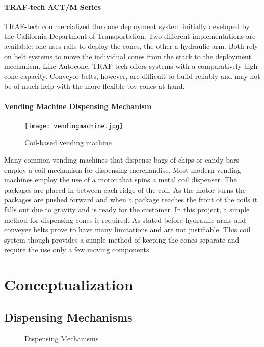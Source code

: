 \documentclass[11pt]{report}
\begin{document}
\subsubsection{TRAF-tech ACT/M Series}
TRAF-tech commercialized the cone deployment system initially developed by the California Department of Transportation. Two different implementations are available: one uses rails to deploy the cones, the other a hydraulic arm. Both rely on belt systems to move the individual cones from the stack to the deployment mechanism. Like Autocone, TRAF-tech offers systems with a comparatively high cone capacity. Conveyor belts, however, are difficult to build reliably and may not be of much help with the more flexible toy cones at hand.

\subsubsection{Vending Machine Dispensing Mechanism}
\begin{figure}
  \begin{center}
    \texttt{[image: vendingmachine.jpg]}
  \end{center}
  \caption{Coil-based vending machine}
\end{figure}


Many common vending machines that dispense bags of chips or candy bars employ a coil mechanism for dispensing merchandise. Most modern vending machines employ the use of a motor that spins a metal coil dispenser. The packages are placed in between each ridge of the coil. As the motor turns the packages are pushed forward and when a package reaches the front of the coils it falls out due to gravity and is ready for the customer. 
In this project, a simple method for dispensing cones is required. As stated before hydraulic arms and conveyer belts prove to have many limitations and are not justifiable. This coil system though provides a simple method of keeping the cones separate and require the use only a few moving components.


\chapter{Conceptualization}
\section{Dispensing Mechanisms}
\begin{figure}
  \centering
\hspace{20pt}             
  \caption{Dispensing Mechanisms}
  \label{fig:dispensing_mechanisms}
\end{figure}
\end{document}
